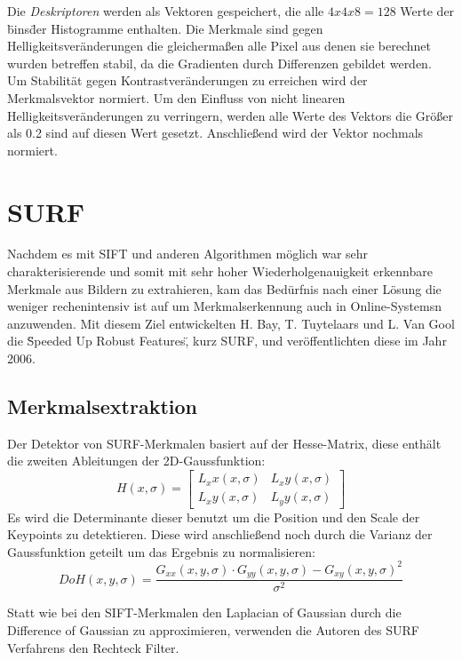 Die \emph{Deskriptoren} werden als Vektoren gespeichert, die alle $4x4x8=128$ Werte der \"bins\" der Histogramme enthalten. 
Die Merkmale sind gegen Helligkeitsveränderungen die gleichermaßen alle Pixel aus denen sie berechnet wurden betreffen stabil, da die Gradienten durch Differenzen gebildet werden.
Um Stabilität gegen Kontrastveränderungen zu erreichen wird der Merkmalsvektor normiert.
Um den Einfluss von nicht linearen Helligkeitsveränderungen zu verringern, werden alle Werte des Vektors die Größer als 0.2 sind auf diesen Wert gesetzt. Anschließend wird der Vektor nochmals normiert. \cite{lowe99}


\section{SURF}

Nachdem es mit SIFT und anderen Algorithmen möglich war sehr charakterisierende und somit mit sehr hoher Wiederholgenauigkeit erkennbare Merkmale aus Bildern zu extrahieren, kam das Bedürfnis nach einer Lösung die weniger rechenintensiv ist auf um Merkmalserkennung auch in \Glspl{Online-System}n anzuwenden.
Mit diesem Ziel entwickelten H. Bay, T. Tuytelaars und L. Van Gool die \"Speeded Up Robust Features\", kurz SURF, und veröffentlichten diese im Jahr 2006.

\subsection{Merkmalsextraktion}

Der Detektor von SURF-Merkmalen basiert auf der Hesse-Matrix, diese enthält die zweiten Ableitungen der 2D-Gaussfunktion:
\begin{equation}
H(x, \sigma) =
\begin{bmatrix}
L_xx (x, \sigma) & L_xy (x, \sigma) \\
L_xy (x, \sigma) & L_yy (x, \sigma)
\end{bmatrix}
\end{equation}
Es wird die Determinante dieser benutzt um die Position und den Scale der Keypoints zu detektieren.
Diese wird anschließend noch durch die Varianz der Gaussfunktion geteilt um das Ergebnis zu normalisieren:
\begin{equation}
DoH(x, y, \sigma)=\dfrac{G_{xx}(x, y, \sigma)\cdot G_{yy}(x, y, \sigma)-G_{xy}(x, y, \sigma)^{2}}{\sigma^{2}}
\end{equation}

Statt wie bei den SIFT-Merkmalen den Laplacian of Gaussian durch die Difference of Gaussian zu approximieren, verwenden die Autoren des SURF Verfahrens den Rechteck Filter.

